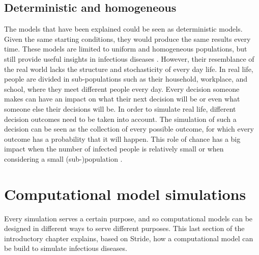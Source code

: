\subsection{Deterministic and homogeneous}
\label{subsec:deterministic_and_homogeneous}
The models that have been explained could be seen as deterministic models. Given the same starting conditions, they would produce the same results every time. These models are limited to uniform and homogeneous populations, but still provide useful insights in infectious diseases \cite{usefulness_models}. However, their resemblance of the real world lacks the structure and stochasticity of every day life. In real life, people are divided in sub-populations such as their household, workplace, and school, where they meet different people every day. Every decision someone makes can have an impact on what their next decision will be or even what someone else their decisions will be. In order to simulate real life, different decision outcomes need to be taken into account. The simulation of such a decision can be seen as the collection of every possible outcome, for which every outcome has a probability that it will happen. This role of chance has a big impact when the number of infected people is relatively small or when considering a small (sub-)population \cite{stochastic_modelling}.

\section{Computational model simulations}
\label{sec:computational_model_simulations}
Every simulation serves a certain purpose, and so computational models can be designed in different ways to serve different purposes. This last section of the introductory chapter explains, based on Stride, how a computational model can be build to simulate infectious diseases. 

